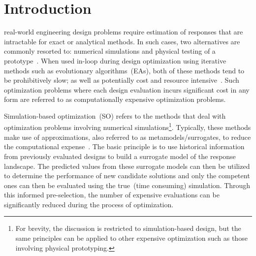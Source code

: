 \section{Introduction}
% 
% 
% 
% 

 real-world engineering design problems require estimation of responses that are intractable for exact or analytical methods. In such cases, two alternatives are commonly resorted to: numerical simulations and physical testing of a prototype~\cite{forrester2008engineering}. When used in-loop during design optimization using iterative methods such as evolutionary algorithms~(EAs), both of these methods tend to be prohibitively slow; as well as potentially cost and resource intensive~\cite{jin2009systems}. Such optimization problems where each design evaluation incurs significant cost in any form are referred to as computationally expensive optimization problems.

Simulation-based optimization~(SO) refers to the methods that deal with optimization problems involving  numerical simulations\footnote{For brevity, the discussion is restricted to simulation-based design, but the same principles can be applied to other expensive optimization such as those involving physical prototyping.}. Typically, these methods make use of approximations, also referred to as metamodels/surrogates, to reduce the computational expense~\cite{amaran2016simulation}. The basic principle is to use historical information from previously evaluated designs to build a surrogate model of the response landscape. The predicted values from these surrogate models can then be utilized to determine the performance of new candidate solutions and only the competent ones can then be evaluated using the true~(time consuming) simulation. Through this informed pre-selection, the number of expensive evaluations can be significantly reduced during the process of optimization. 

